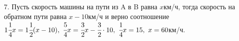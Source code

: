 7. Пусть скорость машины на пути из A в B равна $x$км/ч, тогда скорость на обратном пути равна $x-10$км/ч и верно соотношение $1\cfrac{1}{4}x=1\cfrac{1}{2}(x-10),\
\cfrac{5}{4}x=\cfrac{3}{2}x-\cfrac{3}{2}\cdot10,\ \cfrac{1}{4}x=15,\ x=60$км/ч.\\
